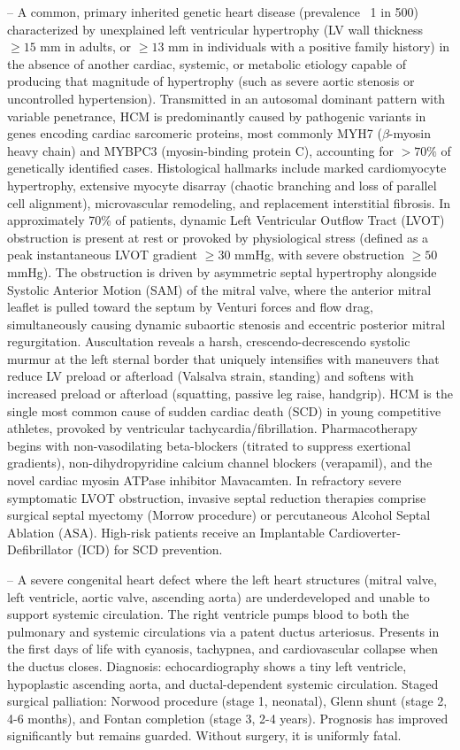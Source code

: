 -- A common, primary inherited genetic heart disease (prevalence ~1 in 500) characterized by unexplained left ventricular hypertrophy (LV wall thickness $\ge 15$ mm in adults, or $\ge 13$ mm in individuals with a positive family history) in the absence of another cardiac, systemic, or metabolic etiology capable of producing that magnitude of hypertrophy (such as severe aortic stenosis or uncontrolled hypertension). Transmitted in an autosomal dominant pattern with variable penetrance, HCM is predominantly caused by pathogenic variants in genes encoding cardiac sarcomeric proteins, most commonly MYH7 ($\beta$-myosin heavy chain) and MYBPC3 (myosin-binding protein C), accounting for $>70\%$ of genetically identified cases. Histological hallmarks include marked cardiomyocyte hypertrophy, extensive myocyte disarray (chaotic branching and loss of parallel cell alignment), microvascular remodeling, and replacement interstitial fibrosis. In approximately 70\% of patients, dynamic Left Ventricular Outflow Tract (LVOT) obstruction is present at rest or provoked by physiological stress (defined as a peak instantaneous LVOT gradient $\ge 30$ mmHg, with severe obstruction $\ge 50$ mmHg). The obstruction is driven by asymmetric septal hypertrophy alongside Systolic Anterior Motion (SAM) of the mitral valve, where the anterior mitral leaflet is pulled toward the septum by Venturi forces and flow drag, simultaneously causing dynamic subaortic stenosis and eccentric posterior mitral regurgitation. Auscultation reveals a harsh, crescendo-decrescendo systolic murmur at the left sternal border that uniquely intensifies with maneuvers that reduce LV preload or afterload (Valsalva strain, standing) and softens with increased preload or afterload (squatting, passive leg raise, handgrip). HCM is the single most common cause of sudden cardiac death (SCD) in young competitive athletes, provoked by ventricular tachycardia/fibrillation. Pharmacotherapy begins with non-vasodilating beta-blockers (titrated to suppress exertional gradients), non-dihydropyridine calcium channel blockers (verapamil), and the novel cardiac myosin ATPase inhibitor Mavacamten. In refractory severe symptomatic LVOT obstruction, invasive septal reduction therapies comprise surgical septal myectomy (Morrow procedure) or percutaneous Alcohol Septal Ablation (ASA). High-risk patients receive an Implantable Cardioverter-Defibrillator (ICD) for SCD prevention.

-- A severe congenital heart defect where the left heart structures (mitral valve, left ventricle, aortic valve, ascending aorta) are underdeveloped and unable to support systemic circulation. The right ventricle pumps blood to both the pulmonary and systemic circulations via a patent ductus arteriosus. Presents in the first days of life with cyanosis, tachypnea, and cardiovascular collapse when the ductus closes. Diagnosis: echocardiography shows a tiny left ventricle, hypoplastic ascending aorta, and ductal-dependent systemic circulation. Staged surgical palliation: Norwood procedure (stage 1, neonatal), Glenn shunt (stage 2, 4-6 months), and Fontan completion (stage 3, 2-4 years). Prognosis has improved significantly but remains guarded. Without surgery, it is uniformly fatal.

